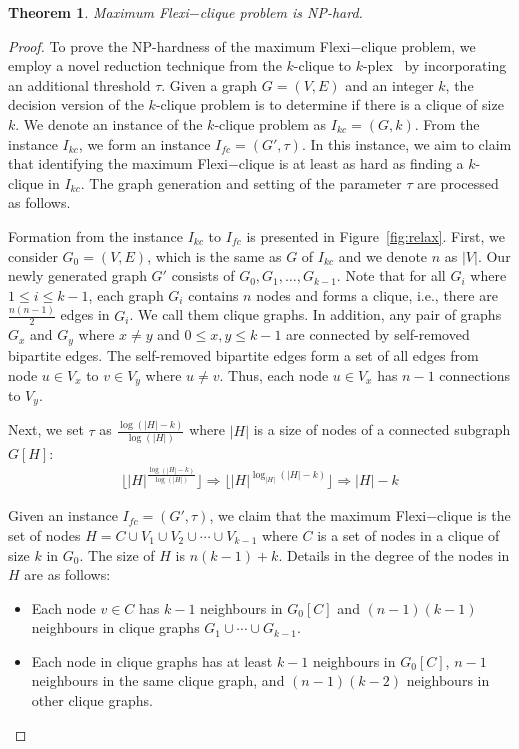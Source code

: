 \documentclass[sigconf]{acmart}
\newtheorem{theorem}{Theorem}
\newcommand{\flexi}{\textsf{Flexi$-$clique}}
\begin{document}
\begin{theorem}
Maximum {\flexi} problem is NP-hard.
\end{theorem}
\vspace{-0.2cm}
\begin{proof}
To prove the NP-hardness of the maximum {\flexi} problem, we employ a novel reduction technique from the $k$-clique to $k$-plex~\cite{balasundaram2011clique} by incorporating an additional threshold $\tau$. Given a graph $G = (V, E)$ and an integer $k$, the decision version of the $k$-clique problem is to determine if there is a clique of size $k$. We denote an instance of the $k$-clique problem as $I_{kc} = (G, k)$. From the instance $I_{kc}$, we form an instance $I_{fc} = (G', \tau)$. In this instance, we aim to claim that identifying the maximum {\flexi} is at least as hard as finding a $k$-clique in $I_{kc}$. The graph generation and setting of the parameter $\tau$ are processed as follows. 

Formation from the instance $I_{kc}$ to $I_{fc}$ is presented in Figure~\ref{fig:relax}. First, we consider $G_0 = (V, E)$, which is the same as $G$ of $I_{kc}$ and we denote $n$ as $|V|$. Our newly generated graph $G'$ consists of $G_0, G_1, \ldots, G_{k-1}$. Note that for all $G_i$ where $1 \leq i \leq k-1$, each graph $G_i$ contains $n$ nodes and forms a clique, i.e., there are $\frac{n(n-1)}{2}$ edges in $G_i$. We call them clique graphs. In addition, any pair of graphs $G_x$ and $G_y$ where $x \neq y$ and $0 \leq x, y \leq k-1$ are connected by self-removed bipartite edges. The self-removed bipartite edges form a set of all edges from node $u \in V_x$ to $v \in V_y$ where $u \neq v$. Thus, each node $u \in V_x$ has $n-1$ connections to $V_y$.

Next, we set $\tau$ as $\frac{\log(|H|-k)}{\log(|H|)}$ where $|H|$ is a size of nodes of a connected subgraph $G[H]$:
\begin{align}
\lfloor |H|^{\frac{\log(|H|-k)}{\log(|H|)}} \rfloor \Rightarrow
\lfloor |H|^{\log_{|H|}(|H|-k)} \rfloor \Rightarrow |H|-k
\end{align}

Given an instance $I_{fc} = (G', \tau)$, we claim that the maximum {\flexi} is the set of nodes $H = C \cup V_1 \cup V_2 \cup \cdots \cup V_{k-1}$ where $C$ is a set of nodes in a clique of size $k$ in $G_0$. The size of $H$ is $n(k-1) + k$. Details in the degree of the nodes in $H$ are as follows:
\begin{itemize}[leftmargin=*]
\item Each node $v \in C$ has $k-1$ neighbours in $G_0[C]$ and $(n-1)(k-1)$ neighbours in clique graphs $G_1 \cup \cdots \cup G_{k-1}$.
\item Each node in clique graphs has at least $k-1$ neighbours in $G_0[C]$, $n-1$ neighbours in the same clique graph, and $(n-1)(k-2)$ neighbours in other clique graphs.
\end{itemize}


\end{proof}
\end{document}
